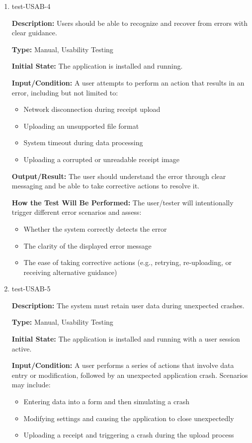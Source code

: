 \documentclass[12pt, titlepage]{article}
\begin{document}
\begin{enumerate}
\item{test-USAB-4\\}

\textbf{Description:} Users should be able to recognize and recover from errors with clear guidance.

\textbf{Type:} Manual, Usability Testing
					
\textbf{Initial State:} The application is installed and running.
					
\textbf{Input/Condition:} A user attempts to perform an action that results in an error, including but not limited to:
\begin{itemize}
    \item Network disconnection during receipt upload
    \item Uploading an unsupported file format
    \item System timeout during data processing
    \item Uploading a corrupted or unreadable receipt image
\end{itemize}

\textbf{Output/Result:} The user should understand the error through clear messaging and be able to take corrective actions to resolve it.

\textbf{How the Test Will Be Performed:} The user/tester will intentionally trigger different error scenarios and assess:
\begin{itemize}
    \item Whether the system correctly detects the error
    \item The clarity of the displayed error message
    \item The ease of taking corrective actions (e.g., retrying, re-uploading, or receiving alternative guidance)
\end{itemize}

\item{test-USAB-5\\}

\textbf{Description:} The system must retain user data during unexpected crashes.

\textbf{Type:} Manual, Usability Testing
					
\textbf{Initial State:} The application is installed and running with a user session active.
					
\textbf{Input/Condition:} A user performs a series of actions that involve data entry 
or modification, followed by an unexpected application crash. Scenarios may include:
\begin{itemize}
    \item Entering data into a form and then simulating a crash
    \item Modifying settings and causing the application to close unexpectedly
    \item Uploading a receipt and triggering a crash during the upload process
\end{itemize}


\end{enumerate}
\end{document}
